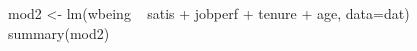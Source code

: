\begin{Schunk}
\begin{Sinput}
 mod2 <- lm(wbeing ~ satis + jobperf + tenure + age, data=dat)
 summary(mod2)
\end{Sinput}
\end{Schunk}
